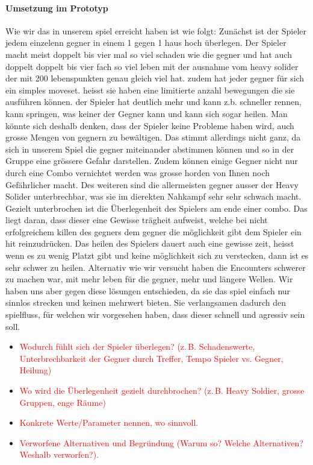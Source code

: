 \documentclass[../Main.tex]{subfiles}
\begin{document}
\paragraph{Umsetzung im Prototyp}
Wie wir das in unserem spiel erreicht haben ist wie folgt: Zunächst ist der Spieler jedem einzelenn gegner in einem 1 gegen 1 haus hoch überlegen. Der Spieler macht meist doppelt bis vier mal so viel schaden wie die gegner und hat auch doppelt doppelt bis vier fach so viel leben mit der ausnahme vom heavy solider der mit 200 lebenspunkten genau gleich viel hat. zudem hat jeder gegner für sich ein simples moveset. heisst sie haben eine limitierte anzahl bewegungen die sie ausführen können. der Spieler hat deutlich mehr und kann z.b. schneller rennen, kann springen, was keiner der Gegner kann und kann sich sogar heilen. Man könnte sich deshalb denken, dass der Spieler keine Probleme haben wird, auch grosse Mengen von gegnern zu bewältigen. Das stimmt allerdings nicht ganz, da sich in unserem Spiel die gegner miteinander abstimmen können und so in der Gruppe eine grössere Gefahr darstellen. Zudem können einige Gegner nicht nur durch eine Combo vernichtet werden was grosse horden von Ihnen noch Gefährlicher macht. Des weiteren sind die allermeisten gegner ausser der Heavy Solider unterbrechbar, was sie im dierekten Nahkampf sehr sehr schwach macht. Gezielt unterbrochen ist die Überlegenheit des Spielers am ende einer combo. Das liegt daran, dass dieser eine Gewisse trägheit aufweist, welche bei nicht erfolgreichem killen des gegners dem gegner die möglichkeit gibt dem Spieler ein hit reinzudrücken. Das heilen des Spielers dauert auch eine gewisse zeit, heisst wenn es zu wenig Platzt gibt und keine möglichkeit sich zu verstecken, dann ist es sehr schwer zu heilen. Alternativ wie wir versucht haben die Encounters schwerer zu machen war, mit mehr leben für die gegner, mehr und längere Wellen. Wir haben uns aber gegen diese lösungen entschieden, da sie das spiel einfach nur sinnlos strecken und keinen mehrwert bieten. Sie verlangsamen dadurch den spielfluss, für welchen wir vorgesehen haben, dass dieser schnell und agressiv sein soll.

\begin{itemize}[leftmargin=1.5cm]
    \item \textcolor{red}{Wodurch fühlt sich der Spieler überlegen? (z.\,B. Schadenswerte, Unterbrechbarkeit der Gegner durch Treffer, Tempo Spieler vs. Gegner, Heilung)}
    \item \textcolor{red}{Wo wird die Überlegenheit gezielt durchbrochen? (z.\,B. Heavy Soldier, grosse Gruppen, enge Räume)}
    \item \textcolor{red}{Konkrete Werte/Parameter nennen, wo sinnvoll.}
    \item \textcolor{red}{Verworfene Alternativen und Begründung (Warum so? Welche Alternativen? Weshalb verworfen?).}
\end{itemize}
\end{document}
